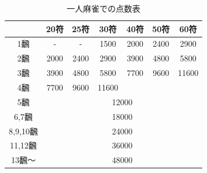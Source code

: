 \begin{table}[p]
	\caption{一人麻雀での点数表}
	\label{tensuu}
	\begin{center}
	 \begin{tabular}{|c|c|c|c|c|c|c|}
	 	\hline
	 	   & 20符 & 25符 & 30符 & 40符 & 50符 & 60符 \\ \hline
	 	1飜 & - & - & 1500 & 2000 & 2400 & 2900 \\ \hline
	 	2飜 & 2000 & 2400 & 2900 & 3900 & 4800 & 5800 \\ \hline
	 	3飜 & 3900 & 4800 & 5800 & 7700 & 9600 & 11600 \\ \hline
	 	4飜 & 7700 & 9600 & 11600 & \multicolumn{3}{|c|}{} \\ \cline{1-4}
	 	5飜 & \multicolumn{6}{|c|}{12000} \\ \hline
	 	6,7飜 & \multicolumn{6}{|c|}{18000} \\ \hline
	 	8,9,10飜 & \multicolumn{6}{|c|}{24000} \\ \hline
	 	11,12飜 & \multicolumn{6}{|c|}{36000} \\ \hline
	 	13飜〜 & \multicolumn{6}{|c|}{48000} \\ \hline
		\end{tabular}
	\end{center}
\end{table}